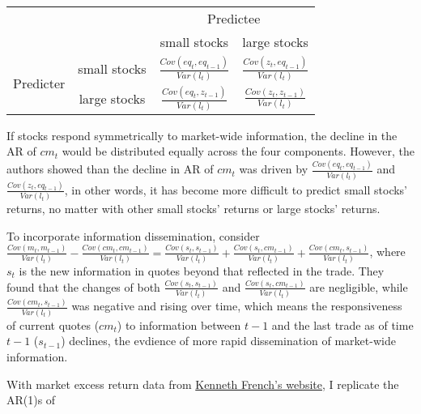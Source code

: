 \begin{enumerate}
    \begin{center}
        \begin{tabular}{cccc} 
        \hline
        & & \multicolumn{2}{c}{Predictee} \\
        & &small stocks & large stocks\\
        \hline
        \multirow{2}{4em}{Predicter} & small stocks & $\frac{Cov(eq_t,eq_{t-1})}{Var(l_t)}$ & $\frac{Cov(z_t,eq_{t-1})}{Var(l_t)}$ \\ 
        & large stocks & $\frac{Cov(eq_t,z_{t-1})}{Var(l_t)}$ & $\frac{Cov(z_t,z_{t-1})}{Var(l_t)}$ \\ 
        \hline
        \end{tabular}
    \end{center}

    If stocks respond symmetrically to market-wide information, the decline in the AR of $cm_t$ would be distributed equally across the four components. However, the authors showed than the decline in AR of $cm_t$ was driven by $\frac{Cov(eq_t,eq_{t-1})}{Var(l_t)}$ and $\frac{Cov(z_t,eq_{t-1})}{Var(l_t)}$,
    in other words, it has become more difficult to predict small stocks' returns, no matter with other small stocks' returns or large stocks' returns. 
    
    To incorporate information dissemination, consider $\frac{Cov(m_t,m_{t-1})}{Var(l_t)}-\frac{Cov(cm_t,cm_{t-1})}{Var(l_t)} = \frac{Cov(s_t,s_{t-1})}{Var(l_t)}+\frac{Cov(s_t,cm_{t-1})}{Var(l_t)}+\frac{Cov(cm_t,s_{t-1})}{Var(l_t)}$, where $s_t$ is the new information in quotes beyond that reflected in the trade. They found that
    the changes of both $\frac{Cov(s_t,s_{t-1})}{Var(l_t)}$ and $\frac{Cov(s_t,cm_{t-1})}{Var(l_t)}$ are negligible, while $\frac{Cov(cm_t,s_{t-1})}{Var(l_t)}$ was negative and rising over time, which means the responsiveness of current quotes ($cm_t$) to information between $t-1$ and the last trade as of time $t-1$ ($s_{t-1}$) declines,
    the evdience of more rapid dissemination of market-wide information.
\end{enumerate}

With market excess return data from \href{https://mba.tuck.dartmouth.edu/pages/faculty/ken.french/data_library.html}{Kenneth French's website}, I replicate the AR(1)s of 
